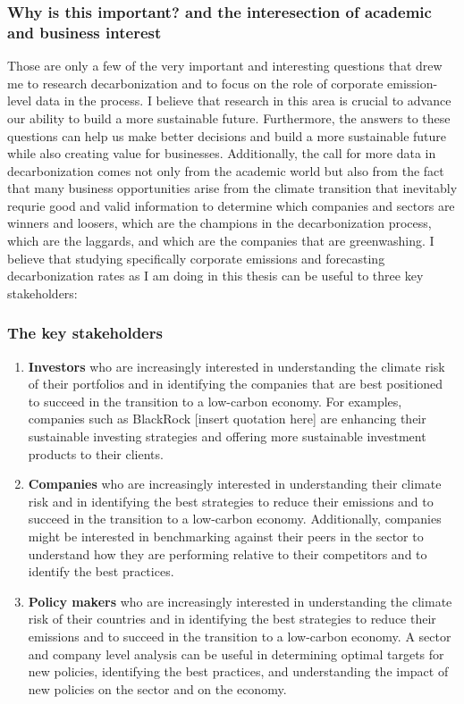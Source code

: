  \subsubsection{Why is this important? and the interesection of academic and business interest}
 \noindent Those are only a few of the very important and interesting questions that drew me to research decarbonization and to focus on the role of corporate emission-level data in the process. I believe that research in this area is crucial to advance our ability to build a more sustainable future. Furthermore, the answers to these questions can help us make better decisions and build a more sustainable future while also creating value for businesses. Additionally, the call for more data in decarbonization comes not only from the academic world but also from the fact that many business opportunities arise from the climate transition that inevitably requrie good and valid information to determine which companies and sectors are winners and loosers, which are the champions in the decarbonization process, which are the laggards, and which are the companies that are greenwashing. I believe that studying specifically corporate emissions and forecasting decarbonization rates as I am doing in this thesis can be useful to three key stakeholders: 
 \subsubsection{The key stakeholders}
 \begin{enumerate}
    \item \textbf{Investors} who are increasingly interested in understanding the climate risk of their portfolios and in identifying the companies that are best positioned to succeed in the transition to a low-carbon economy. For examples, companies such as BlackRock [insert quotation here] are enhancing their sustainable investing strategies and offering more sustainable investment products to their clients.
    \item \textbf{Companies} who are increasingly interested in understanding their climate risk and in identifying the best strategies to reduce their emissions and to succeed in the transition to a low-carbon economy. Additionally, companies might be interested in benchmarking against their peers in the sector to understand how they are performing relative to their competitors and to identify the best practices. 
    \item \textbf{Policy makers} who are increasingly interested in understanding the climate risk of their countries and in identifying the best strategies to reduce their emissions and to succeed in the transition to a low-carbon economy. A sector and company level analysis can be useful in determining optimal targets for new policies, identifying the best practices, and understanding the impact of new policies on the sector and on the economy.
\end{enumerate}

